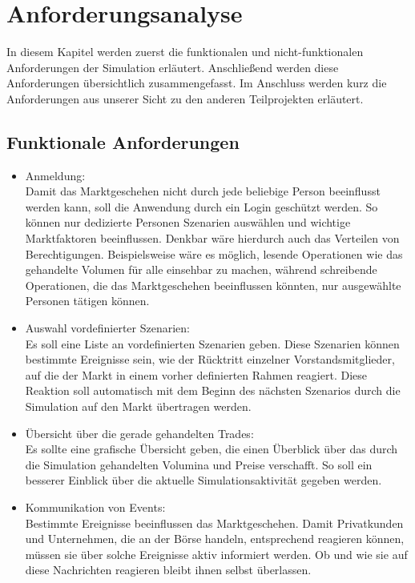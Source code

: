 \chapter{Anforderungsanalyse}

In diesem Kapitel werden zuerst die funktionalen und nicht-funktionalen Anforderungen der Simulation erläutert. Anschließend werden diese Anforderungen übersichtlich zusammengefasst. Im Anschluss werden kurz die Anforderungen aus unserer Sicht zu den anderen Teilprojekten erläutert.
\section{Funktionale Anforderungen}
	\begin{itemize}
		\item Anmeldung: \\
			Damit das Marktgeschehen nicht durch jede beliebige Person beeinflusst werden kann, soll die Anwendung durch ein Login geschützt werden. So können nur dedizierte Personen Szenarien auswählen und wichtige Marktfaktoren beeinflussen. Denkbar wäre hierdurch auch das Verteilen von Berechtigungen.
			Beispielsweise wäre es möglich, lesende Operationen wie das gehandelte Volumen für alle einsehbar zu machen, während schreibende Operationen, die das Marktgeschehen beeinflussen könnten, nur ausgewählte Personen tätigen können.
		
		\item Auswahl vordefinierter Szenarien: \\
			Es soll eine Liste an vordefinierten Szenarien geben. Diese Szenarien können bestimmte Ereignisse sein, wie der Rücktritt einzelner Vorstandsmitglieder, auf die der Markt in einem vorher definierten Rahmen reagiert. Diese Reaktion soll automatisch mit dem Beginn des nächsten Szenarios durch die Simulation auf den Markt übertragen werden.
			
		\item Übersicht über die gerade gehandelten Trades: \\
			Es sollte eine grafische Übersicht geben, die einen Überblick über das durch die Simulation gehandelten Volumina und Preise verschafft.
			So soll ein besserer Einblick über die aktuelle Simulationsaktivität gegeben werden.
			
		\item Kommunikation von Events: \\
			Bestimmte Ereignisse beeinflussen das Marktgeschehen. Damit Privatkunden und Unternehmen, die an der Börse handeln, entsprechend reagieren können, müssen sie über solche Ereignisse aktiv informiert werden. Ob und wie sie auf diese Nachrichten reagieren bleibt ihnen selbst überlassen.
			

\end{itemize}
